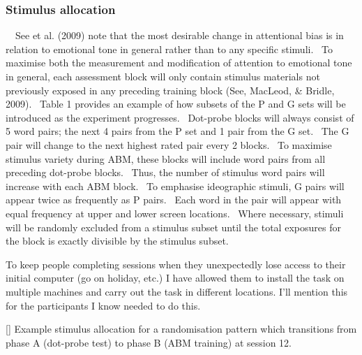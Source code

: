 \documentclass[man,a4paper,biblatex]{apa6}
\begin{document}
\subsubsection[Stimulus allocation]{Stimulus allocation}
\ \ See et al. (2009) note that the most desirable change in attentional bias is in relation to emotional tone in general rather than to any specific stimuli. \ To maximise both the measurement and modification of attention to emotional tone in general, each assessment block will only contain stimulus materials not previously exposed in any preceding training block (See, MacLeod, \& Bridle, 2009). \ Table 1 provides an example of how subsets of the P and G sets will be introduced as the experiment progresses. \ Dot-probe blocks will always consist of 5 word pairs; the next 4 pairs from the P set and 1 pair from the G set. \ The G pair will change to the next highest rated pair every 2 blocks. \ To maximise stimulus variety during ABM, these blocks will include word pairs from all preceding dot-probe blocks. \ Thus, the number of stimulus word pairs will increase with each ABM block. \ To emphasise ideographic stimuli, G pairs will appear twice as frequently as P pairs. \ Each word in the pair will appear with equal frequency at upper and lower screen locations. \ Where necessary, stimuli will be randomly excluded from a stimulus subset until the total exposures for the block is exactly divisible by the stimulus subset.

To keep people completing sessions when they unexpectedly lose access
to their initial computer (go on holiday, etc.) I have allowed them
to install the task on multiple machines and carry out the task in
different locations.  I'll mention this for the participants I know
needed to do this.

[]{}
Example stimulus allocation for a randomisation pattern which transitions from phase A (dot-probe test) to phase B (ABM training) at session 12.
\end{document}
